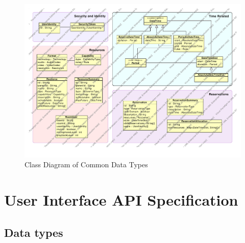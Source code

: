 \documentclass[a4paper]{report}
\begin{document}
\begin{figure}[ht!]
\includegraphics[width=\textwidth]{img/common_data_types.pdf}
\caption{Class Diagram of Common Data Types}
\end{figure}


\chapter{User Interface API Specification}

\section{Data types}
\end{document}
